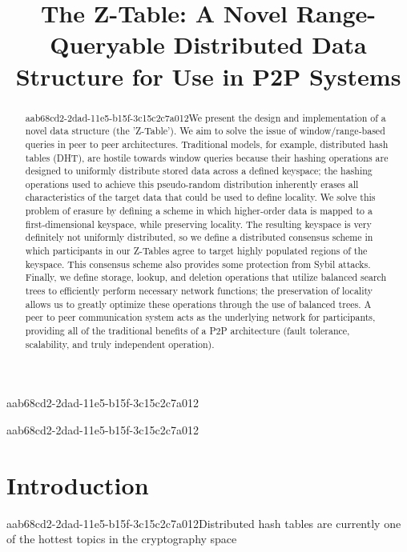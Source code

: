 \documentclass[12pt]{article}
\title{The Z-Table: A Novel Range-Queryable Distributed Data Structure for Use in P2P Systems}
\begin{document}
aab68cd2-2dad-11e5-b15f-3c15c2c7a012
\maketitle

\begin{abstract}
aab68cd2-2dad-11e5-b15f-3c15c2c7a012We present the design and implementation of a novel data structure (the 'Z-Table'). We aim to solve the issue of window/range-based queries in peer to peer architectures. Traditional models, for example,  distributed hash tables (DHT), are hostile towards window queries because their hashing operations are designed to uniformly distribute stored data across a defined keyspace; the hashing operations used to achieve this pseudo-random distribution inherently erases all characteristics of the target data that could be used to define locality. We solve this problem of erasure by defining a scheme in which higher-order data is mapped to a first-dimensional keyspace, while preserving locality. The resulting keyspace is very definitely not uniformly distributed, so we define a distributed consensus scheme in which participants in our Z-Tables agree to target highly populated regions of the keyspace. This consensus scheme also provides some protection from Sybil attacks. Finally, we define storage, lookup, and deletion operations that utilize balanced search trees to efficiently perform necessary network functions; the preservation of locality allows us to greatly optimize these operations through the use of balanced trees. A peer to peer communication system acts as the underlying network for participants, providing all of the traditional benefits of a P2P architecture (fault tolerance, scalability, and truly independent operation).
\end{abstract}

aab68cd2-2dad-11e5-b15f-3c15c2c7a012
\newpage
\section{Introduction}
aab68cd2-2dad-11e5-b15f-3c15c2c7a012Distributed hash tables are currently one of the hottest topics in the cryptography space~\cite{Stoica:2001dj,Rowstron:2001ea,Ratnasamy:2001wn}

\printbibliography
\end{document}
